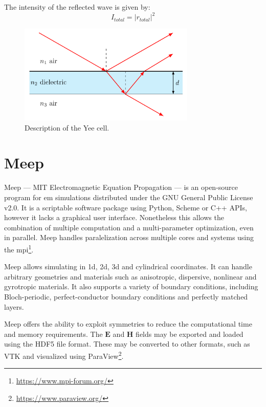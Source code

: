 The intensity of the reflected wave is given by:
\begin{equation}
  I_{total} = \left|r_{total}\right|^2
\end{equation}

\begin{figure}[H]\label{fig:thin-film}
  \centering
  \includegraphics[width=0.75\textwidth]{figures/thin-film.pdf}
  \caption{Description of the Yee cell.}
\end{figure}




\section{Meep}\label{sec:meep}
Meep --- MIT Electromagnetic Equation Propagation --- is an open-source program for \gls{em} simulations distributed under the GNU General Public License v2.0. It is a scriptable software package using Python, Scheme or C++ APIs, however it lacks a graphical user interface. Nonetheless this allows the combination of multiple computation and a multi-parameter optimization, even in parallel. Meep handles paralelization across multiple cores and systems using the \gls{mpi}\footnote{\url{https://www.mpi-forum.org/}}. 

Meep allows simulating in \gls{1d}, \gls{2d}, \gls{3d} and cylindrical coordinates. It can handle arbitrary geometries and materials such as anisotropic, dispersive, nonlinear and gyrotropic materials. It also supports a variety of boundary conditions, including Bloch-periodic, perfect-conductor boundary conditions and perfectly matched layers. 

Meep offers the ability to exploit symmetries to reduce the computational time and memory requirements. The $\mathbf{E}$ and $\mathbf{H}$ fields may be exported and loaded using the HDF5 file format. These may be converted to other formats, such as VTK and visualized using ParaView\footnote{\url{https://www.paraview.org/}}. 

